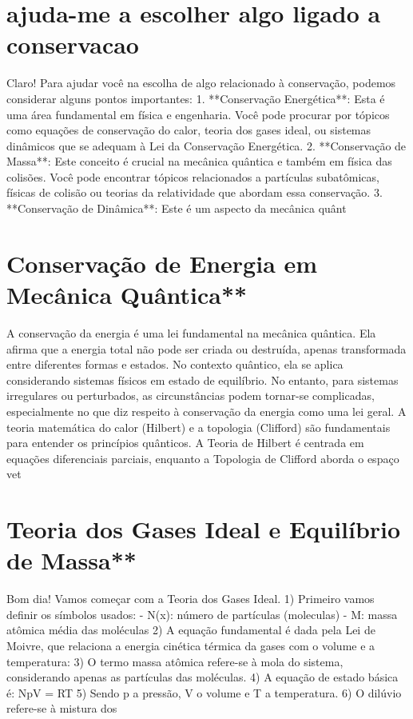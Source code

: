\documentclass[11pt,a4paper]{article}
\begin{document}
\section{ajuda-me a escolher algo ligado a conservacao}
Claro! Para ajudar você na escolha de algo relacionado à conservação, podemos considerar alguns pontos importantes: 1. **Conservação Energética**: Esta é uma área fundamental em física e engenharia. Você pode procurar por tópicos como equações de conservação do calor, teoria dos gases ideal, ou sistemas dinâmicos que se adequam à Lei da Conservação Energética. 2. **Conservação de Massa**: Este conceito é crucial na mecânica quântica e também em física das colisões. Você pode encontrar tópicos relacionados a partículas subatômicas, físicas de colisão ou teorias da relatividade que abordam essa conservação. 3. **Conservação de Dinâmica**: Este é um aspecto da mecânica quânt

\section{Conservação de Energia em Mecânica Quântica**}
A conservação da energia é uma lei fundamental na mecânica quântica. Ela afirma que a energia total não pode ser criada ou destruída, apenas transformada entre diferentes formas e estados. No contexto quântico, ela se aplica considerando sistemas físicos em estado de equilíbrio. No entanto, para sistemas irregulares ou perturbados, as circunstâncias podem tornar-se complicadas, especialmente no que diz respeito à conservação da energia como uma lei geral. A teoria matemática do calor (Hilbert) e a topologia (Clifford) são fundamentais para entender os princípios quânticos. A Teoria de Hilbert é centrada em equações diferenciais parciais, enquanto a Topologia de Clifford aborda o espaço vet

\section{Teoria dos Gases Ideal e Equilíbrio de Massa**}
Bom dia! Vamos começar com a Teoria dos Gases Ideal. 1) Primeiro vamos definir os símbolos usados: - N(x): número de partículas (moleculas) - M: massa atômica média das moléculas 2) A equação fundamental é dada pela Lei de Moivre, que relaciona a energia cinética térmica da gases com o volume e a temperatura: 3) O termo massa atômica refere-se à mola do sistema, considerando apenas as partículas das moléculas. 4) A equação de estado básica é: NpV = RT 5) Sendo p a pressão, V o volume e T a temperatura. 6) O dilúvio refere-se à mistura dos
\end{document}
